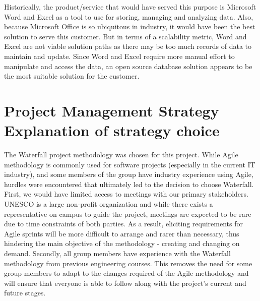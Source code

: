 \documentclass[11pt]{article}
\begin{document}
Historically, the product/service that would have served this purpose is Microsoft Word and Excel as a tool to use for storing, managing and analyzing data. Also, because Microsoft Office is so ubiquitous in industry, it would have been the best solution to serve this customer. But in terms of a scalability metric, Word and Excel are not viable solution paths as there may be too much records of data to maintain and update. Since Word and Excel require more manual effort to manipulate and access the data, an open source database solution appears to be the most suitable solution for the customer. \\

\newpage

\section*{Project Management Strategy Explanation of strategy choice}

The Waterfall project methodology was chosen for this project. While Agile methodology is commonly used for software projects (especially in the current IT industry), and some members of the group have industry experience using Agile, hurdles were encountered that ultimately led to the decision to choose Waterfall. First, we would have limited access to meetings with our primary stakeholders. UNESCO is a large non-profit organization and while there exists a representative on campus to guide the project, meetings are expected to be rare due to time constraints of both parties. As a result, eliciting requirements for Agile sprints will be more difficult to arrange and rarer than necessary, thus hindering the main objective of the methodology - creating and changing on demand. Secondly, all group members have experience with the Waterfall methodology from previous engineering courses. This removes the need for some group members to adapt to the changes required of the Agile methodology and will ensure that everyone is able to follow along with the project's current and future stages. \\

\printbibliography
\end{document}
